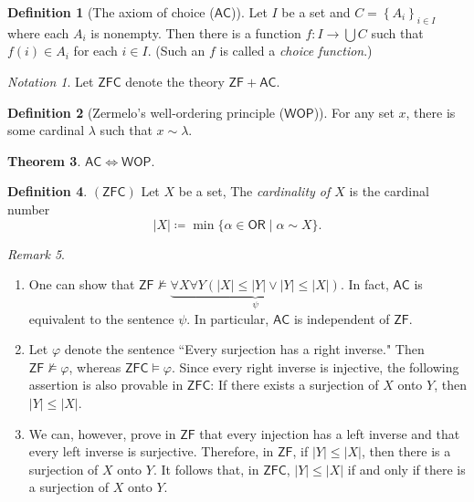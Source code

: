 \documentclass[10pt,letterpaper,cm]{nupset}
\theoremstyle{definition}
\newtheorem{definition}{Definition}[subsection]
\theoremstyle{theorem}
\newtheorem{theorem}[definition]{Theorem}
\theoremstyle{remark}
\newtheorem{remark}[definition]{Remark}
\newtheorem*{notation}{Notation}
\newcommand{\1}{\mathbf{1}}
\newcommand{\0}{\vec 0}
\newcommand{\zf}{\mathsf{ZF}}
\newcommand{\zfc}{\mathsf{ZFC}}
\newcommand{\ac}{\mathsf{AC}}
\newcommand{\ord}{\mathsf{OR}}
\begin{document}
\begin{definition}[The axiom of choice ($\ac$)]
Let $I$ be a set and $C = \left\{A_i  \right\}_{i\in I}$ where each $A_i$ is nonempty. Then there is a function $f : I \to \bigcup{C}$ such that $f(i) \in A_i$ for each $i\in I$. (Such an $f$ is called a \textit{choice function}.)
\end{definition}


\begin{notation}
Let $\zfc$ denote the theory $\zf + \ac$.
\end{notation}

\begin{definition}[Zermelo's well-ordering principle ($\mathsf{WOP}$)]
For any set $x$, there is some cardinal $\lambda$ such that $x \sim \lambda$.
\end{definition}

\begin{theorem}\label{AW}
$\ac \iff \mathsf{WOP}$.
\end{theorem}

\begin{definition}{$(\zfc)$}
Let $X$ be a set, The \textit{cardinality of $X$} is the cardinal number $$\left\lvert{X}\right\rvert \coloneqq \min\{\alpha \in \ord \mid \alpha \sim X\}.$$
\end{definition}

\begin{remark}\label{LR} $ $
\begin{enumerate}
\item One can show that $\zf \nvDash \underbrace{\forall X\forall Y(\left\lvert{X}\right\rvert \leq \left\lvert{Y}\right\rvert \vee \left\lvert{Y}\right\rvert \leq \left\lvert{X}\right\rvert)}_{\psi}$. In fact,  $\ac$ is equivalent to the sentence $\psi$. In particular, $\ac$ is independent of $\zf$.
\item Let $\varphi$ denote the sentence ``Every surjection has a right inverse."  Then $\zf \nvDash \varphi$, whereas  $\zfc \models \varphi$. Since every right inverse is injective, the following assertion is also provable in $\zfc$: If there exists a surjection of $X$ onto $Y$, then $\left\lvert{Y}\right\rvert \leq \left\lvert{X}\right\rvert$. 
\item We can, however, prove in $\zf$ that every injection has a left inverse and that every left inverse is surjective. Therefore, in $\zf$, if $\left\lvert{Y}\right\rvert \leq \left\lvert{X}\right\rvert$, then there is a surjection of $X$ onto $Y$. It follows that, in $\zfc$, $\left\lvert{Y}\right\rvert \leq \left\lvert{X}\right\rvert$ if and only if there is a surjection of $X$ onto $Y$.
\end{enumerate}
\end{remark}
\end{document}
